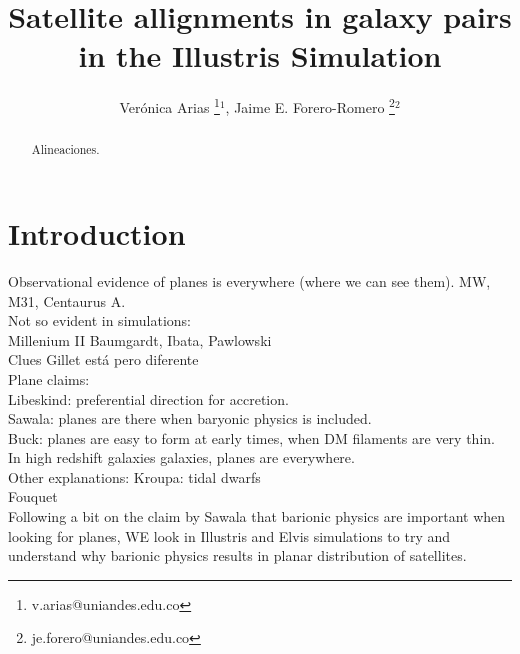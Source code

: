 \documentclass{emulateapj}
\begin{document}
\title{Satellite allignments in galaxy pairs in the Illustris Simulation}
\author{
  Ver\'onica Arias \thanks{v.arias@uniandes.edu.co}$^{1}$,
  Jaime E. Forero-Romero \thanks{je.forero@uniandes.edu.co}$^{2}$ 
}





\begin{abstract}
Alineaciones.
\end{abstract}


\section{Introduction}

Observational evidence of planes is everywhere (where we can see them). MW, M31, Centaurus A.\\

Not so evident in simulations:\\

Millenium II Baumgardt, Ibata, Pawlowski\\

Clues Gillet está pero diferente\\

Plane claims:\\
Libeskind: preferential direction for accretion.\\
Sawala: planes are there when baryonic physics is included.\\
Buck: planes are easy to form at early times, when DM filaments are very thin. In high redshift galaxies galaxies, planes are everywhere.\\

Other explanations: Kroupa: tidal dwarfs\\
Fouquet\\



 
Following a bit on the claim by Sawala that barionic physics are important when looking for planes, WE look in Illustris and Elvis simulations to try and understand why barionic physics results in planar distribution of satellites.
\end{document}
